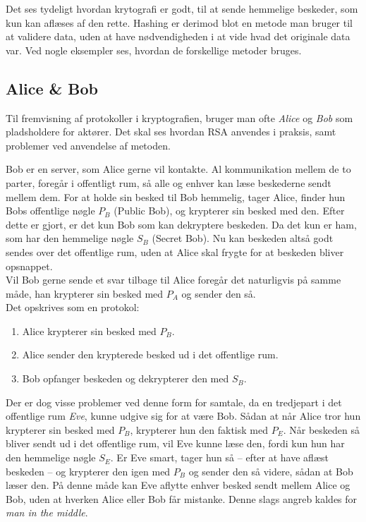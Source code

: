 Det ses tydeligt hvordan krytografi er godt, til at sende hemmelige beskeder, som kun kan aflæses af den rette.
Hashing er derimod blot en metode man bruger til at validere data, uden at have nødvendigheden i at vide hvad det originale data var.
Ved nogle eksempler ses, hvordan de forskellige metoder bruges.


\subsection{Alice \& Bob}
Til fremvisning af protokoller i kryptografien, bruger man ofte \emph{Alice} og \emph{Bob} som pladsholdere for aktører.
Det skal ses hvordan RSA anvendes i praksis, samt problemer ved anvendelse af metoden.

\begin{eks}
    Bob er en server, som Alice gerne vil kontakte.
    Al kommunikation mellem de to parter, foregår i offentligt rum, så alle og enhver kan læse beskederne sendt mellem dem.
    For at holde sin besked til Bob hemmelig, tager Alice, finder hun Bobs offentlige nøgle \(P_B\) (Public Bob), og krypterer sin besked med den.
    Efter dette er gjort, er det kun Bob som kan dekryptere beskeden. Da det kun er ham, som har den hemmelige nøgle \(S_B\) (Secret Bob).
    Nu kan beskeden altså godt sendes over det offentlige rum, uden at Alice skal frygte for at beskeden bliver opsnappet.\\
    Vil Bob gerne sende et svar tilbage til Alice foregår det naturligvis på samme måde, han krypterer sin besked med \(P_A\) og sender den så.\\

    Det opskrives som en protokol:
    \begin{enumerate}[noitemsep]
        \item Alice krypterer sin besked med \(P_B\).
        \item Alice sender den krypterede besked ud i det offentlige rum.
        \item Bob opfanger beskeden og dekrypterer den med \(S_B\).
    \end{enumerate}
\end{eks}

Der er dog visse problemer ved denne form for samtale, da en tredjepart i det offentlige rum \emph{Eve}, kunne udgive sig for at være Bob.
Sådan at når Alice tror hun krypterer sin besked med \(P_B\), krypterer hun den faktisk med \(P_E\).
Når beskeden så bliver sendt ud i det offentlige rum, vil Eve kunne læse den, fordi kun hun har den hemmelige nøgle \(S_E\).
Er Eve smart, tager hun så -- efter at have aflæst beskeden -- og krypterer den igen med \(P_B\) og sender den så videre, sådan at Bob læser den.
På denne måde kan Eve aflytte enhver besked sendt mellem Alice og Bob, uden at hverken Alice eller Bob får mistanke.
Denne slags angreb kaldes for \emph{man in the middle}. \cite{ytmitm}


